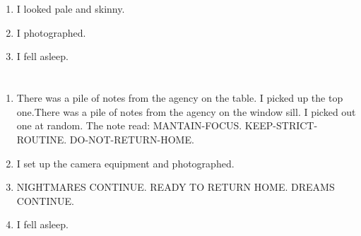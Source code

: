 \documentclass{article}
\begin{document}
    \newpage
    
    \section{}
    
    \begin{enumerate}
    
    \item I looked pale and skinny.\\
    
    \item I photographed.\\
    
    \item I fell asleep.\\
    
    \end{enumerate}
     
    \newpage
    
    \section{}
    
    \begin{enumerate}
    
    \item There was a pile of notes from the agency on the table. I picked up the top one.There was a pile of notes from the agency on the window sill. I picked out one at random. The note read: MANTAIN-FOCUS. KEEP-STRICT-ROUTINE. DO-NOT-RETURN-HOME.\\
    
    \item I set up the camera equipment and photographed.\\
    
    \item NIGHTMARES CONTINUE. READY TO RETURN HOME. DREAMS CONTINUE.\\
    
    \item I fell asleep.\\
    
    \end{enumerate}
     
    \newpage
    
    \section{}
    
\end{document}
